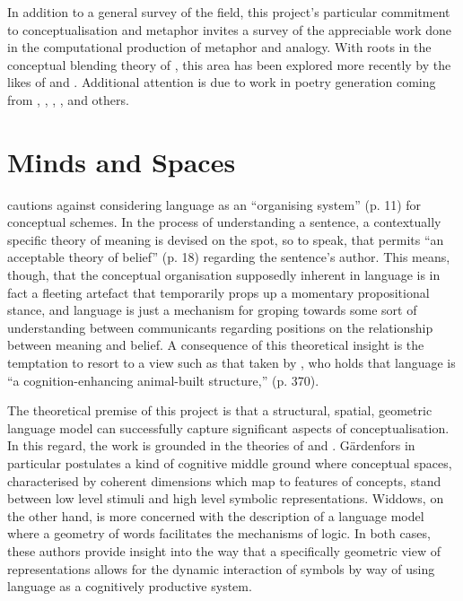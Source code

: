 In addition to a general survey of the field, this project's particular commitment to conceptualisation and metaphor invites a survey of the appreciable work done in the computational production of metaphor and analogy.  With roots in the conceptual blending theory of \cite{Turner}, this area has been explored more recently by the likes of \cite{VealeEA2007} and \cite{O'Donoghue}.  Additional attention is due to work in poetry generation coming from \cite{Gervas}, \cite{Toivonen}, \cite{Rashel}, \cite{Cardosa}, and others.

\section{Minds and Spaces}
\cite{Davidson} cautions against considering language as an ``organising system'' (p. 11) for conceptual schemes.  In the process of understanding a sentence, a contextually specific theory of meaning is devised on the spot, so to speak, that permits ``an acceptable theory of belief'' (p. 18) regarding the sentence's author.  This means, though, that the conceptual organisation supposedly inherent in language is in fact a fleeting artefact that temporarily props up a momentary propositional stance, and language is just a mechanism for groping towards some sort of understanding between communicants regarding positions on the relationship between meaning and belief.  A consequence of this theoretical insight is the temptation to resort to a view such as that taken by \cite{Clark}, who holds that language is ``a cognition-enhancing animal-built structure,'' (p. 370).

The theoretical premise of this project is that a structural, spatial, geometric language model can successfully capture significant aspects of conceptualisation.  In this regard, the work is grounded in the theories of \cite{Gardenfors} and \cite{Widdows}.  G\"{a}rdenfors in particular postulates a kind of cognitive middle ground where conceptual spaces, characterised by coherent dimensions which map to features of concepts, stand between low level stimuli and high level symbolic representations.  Widdows, on the other hand, is more concerned with the description of a language model where a geometry of words facilitates the mechanisms of logic.  In both cases, these authors provide insight into the way that a specifically geometric view of representations allows for the dynamic interaction of symbols by way of using language as a cognitively productive system.


